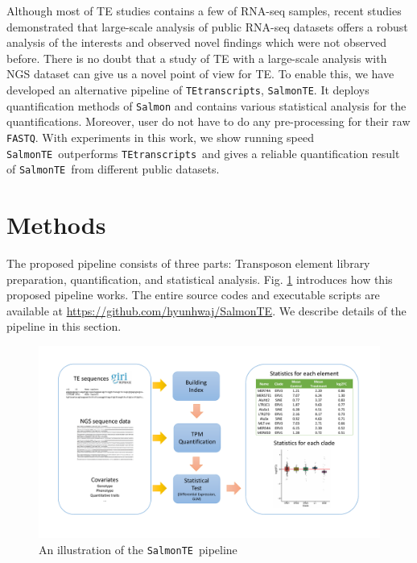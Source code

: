 \documentclass{ws-procs11x85}
\newcommand{\TEtranscripts}{\texttt{TEtranscripts}}
\newcommand{\SalmonTE}{\texttt{SalmonTE}}
\begin{document}
Although most of TE studies contains a few of RNA-seq samples, recent studies demonstrated that large-scale analysis of public RNA-seq 
datasets offers a robust analysis of the interests and observed novel 
findings which were not observed before. \cite{nellore2016human} There is no doubt that a study of TE with a large-scale analysis with NGS dataset can give us a novel point of view for TE. To enable this, we have developed an alternative pipeline of \TEtranscripts, \SalmonTE. It deploys quantification methods of \verb|Salmon|\cite{patro2017salmon} and contains various statistical analysis for the quantifications. Moreover, user do not have to do any pre-processing for their raw \verb|FASTQ|. 
With experiments in this work, we show running speed \SalmonTE~outperforms \TEtranscripts~and gives a reliable quantification result of \SalmonTE~from different public datasets.

\section{Methods}

The proposed pipeline consists of three parts: Transposon element library preparation, quantification, and statistical analysis. Fig. \ref{aba:fig1} introduces how this proposed pipeline works.
The entire source codes and executable scripts are available at \url{https://github.com/hyunhwaj/SalmonTE}. We describe details of the pipeline in this section. 

\begin{figure}[!ht]
\centerline{
\includegraphics[width=16cm]{fig1.pdf}
}
\caption{An illustration of the \SalmonTE~pipeline}
\label{aba:fig1}
\end{figure}
\end{document}
